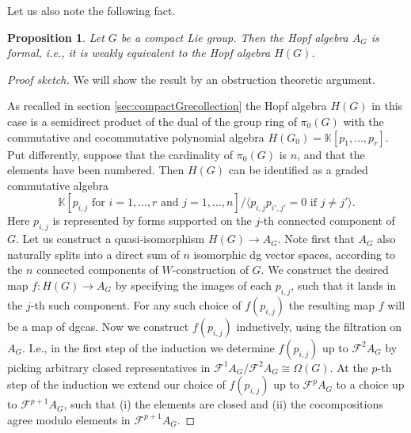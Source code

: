 \documentclass[a4paper]{amsart}
\theoremstyle{plain}
\newtheorem{prop}[thm]{Proposition}
\theoremstyle{definition}
\newcommand{\K}{{\mathbb{K}}}
\newcommand{\mF}{\mathcal{F}}
\begin{document}
Let us also note the following fact.

\begin{prop}\label{prop:Hopf formality}
Let $G$ be a compact Lie group.
Then the Hopf algebra $A_G$ is formal, i.e., it is weakly equivalent to the Hopf algebra $H(G)$.
\end{prop}
\begin{proof}[Proof sketch]
We will show the result by an obstruction theoretic argument. 

As recalled in section \ref{sec:compactGrecollection} the Hopf algebra $H(G)$ in this case is a semidirect product of the dual of the group ring of $\pi_0(G)$ with the commutative and cocommutative polynomial algebra $H(G_0)=\K[p_1,\dots,p_r]$.
Put differently, suppose that the cardinality of $\pi_0(G)$ is $n$, and that the elements have been numbered.
Then $H(G)$ can be identified as a graded commutative algebra 
\[
\K[p_{i,j} \text{ for } i=1,\dots,r \text{ and } j=1,\dots,n]/\langle p_{i,j}p_{i',j'}=0 \text{ if $j\neq j'$} \rangle .
\]
Here $p_{i,j}$ is represented by forms supported on the $j$-th connected component of $G$.
Let us construct a quasi-isomorphism $H(G) \to A_G$.
Note first that $A_G$ also naturally splits into a direct sum of $n$ isomorphic dg vector spaces, according to the $n$ connected components of $W$-construction of $G$.
We construct the desired map $f:H(G) \to A_G$ by specifying the images of each $p_{i,j}$, such that it lands in the $j$-th such component. For any such choice of $f(p_{i,j})$ the resulting map $f$ will be a map of dgcas.
Now we construct $f(p_{i,j})$ inductively, using the filtration on $A_G$.
I.e., in the first step of the induction we determine $f(p_{i,j})$ up to $\mF^2 A_G$ by picking arbitrary closed representatives in $\mF^1 A_G/\mF^2 A_G\cong \Omega(G)$.
At the $p$-th step of the induction we extend our choice of $f(p_{i,j})$ up to $\mF^p A_G$ to a choice up to $\mF^{p+1} A_G$, such that (i) the elements are closed and (ii) the cocompositions agree modulo elements in $\mF^{p+1} A_G$.


\end{proof}
\end{document}
